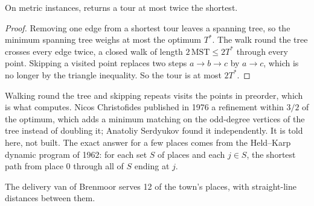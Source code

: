 \begin{theorem}\label{thm:b3:hard-problems:tree-doubling}
On metric instances,  returns a tour at most twice the shortest.
\end{theorem}

\begin{proof}
Removing one edge from a shortest tour leaves a spanning tree, so the minimum spanning tree weighs at most the optimum $T^*$. The walk round the tree crosses every edge twice, a closed walk of length $2\,\mathrm{MST} \le 2T^*$ through every point. Skipping a visited point replaces two steps $a \to b \to c$ by $a \to c$, which is no longer by the triangle inequality. So the tour is at most $2T^*$.
\end{proof}

Walking round the tree and skipping repeats visits the points in preorder, which is what  computes. Nicos Christofides published in 1976 a refinement within $3/2$ of the optimum, which adds a minimum matching on the odd-degree vertices of the tree instead of doubling it; Anatoliy Serdyukov found it independently. %
It is told here, not built. The exact answer for a few places comes from the Held--Karp dynamic program of 1962: for each set $S$ of places and each $j \in S$, the shortest path from place 0 through all of $S$ ending at $j$. %

\label{lst:b3:hard-problems:held-karp}

\label{lst:b3:hard-problems:doubling}

The delivery van of Brenmoor serves 12 of the town's places, with straight-line distances between them.

